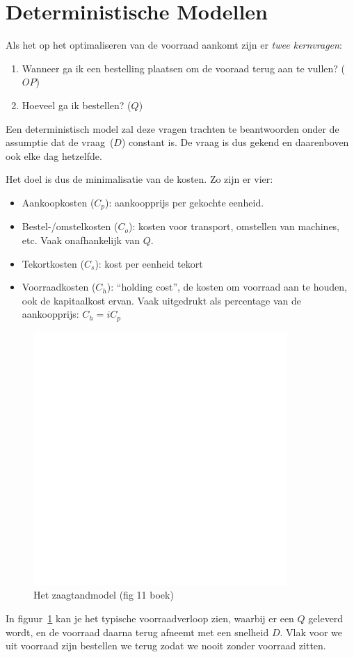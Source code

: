 \section{Deterministische Modellen}

Als het op het optimaliseren van de voorraad aankomt zijn er \textit{twee kernvragen}:
\begin{enumerate}
    \item Wanneer ga ik een bestelling plaatsen om de vooraad terug aan te vullen? ($OP$)
    \item Hoeveel ga ik bestellen? ($Q$)
\end{enumerate}

Een deterministisch model zal deze vragen trachten te beantwoorden onder de assumptie dat de vraag~($D$) constant is. De vraag is dus gekend en daarenboven ook elke dag hetzelfde.

Het doel is dus de minimalisatie van de kosten. Zo zijn er vier:
\begin{itemize}
    \item Aankoopkosten ($C_p$): aankoopprijs per gekochte eenheid.
    \item Bestel-/omstelkosten ($C_o$): kosten voor transport, omstellen van machines, etc. Vaak onafhankelijk van $Q$.
    \item Tekortkosten ($C_s$): kost per eenheid tekort
    \item Voorraadkosten ($C_h$): ``holding cost'', de kosten om voorraad aan te houden, ook de kapitaalkost ervan. Vaak uitgedrukt als percentage van de aankoopprijs: $C_h = i C_p$
\end{itemize}

\begin{figure}[htbp]
    \centering
    \includegraphics[scale=0.4]{Images/white.png}
    \caption{Het zaagtandmodel (fig 11 boek)}
    \label{fig:zaagtandmodel}
\end{figure}
In figuur~\ref{fig:zaagtandmodel} kan je het typische voorraadverloop zien, waarbij er een $Q$ geleverd wordt, en de voorraad daarna terug afneemt met een snelheid $D$. Vlak voor we uit voorraad zijn bestellen we terug zodat we nooit zonder voorraad zitten.


